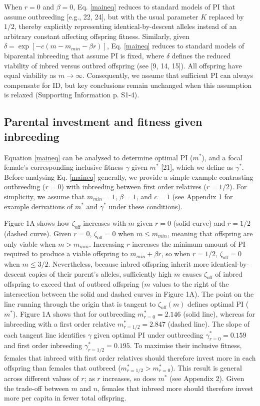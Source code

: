 \documentclass[12pt]{article}
\begin{document}
When $r=0$ and $\beta=0$, Eq. \ref{maineq} reduces to standard models of PI that assume outbreeding [e.g., 22, 24], but with the usual parameter $K$ replaced by $1/2$, thereby explicitly representing identical-by-descent alleles instead of an arbitrary constant affecting offspring fitness. Similarly, given $\delta = \exp\left[-c\left(m-m_{min}-\beta r\right)\right]$, Eq. \ref{maineq} reduces to standard models of biparental inbreeding that assume PI is fixed, where $\delta$ defines the reduced viability of inbred versus outbred offspring (see [9, 14, 15]).  All offspring have equal viability as $m \to \infty$. Consequently, we assume that sufficient PI can always compensate for ID, but key conclusions remain unchanged when this assumption is relaxed (Supporting Information p. S1-4).

\subsection*{Parental investment and fitness given inbreeding}

Equation \ref{maineq} can be analysed to determine optimal PI ($m^{*}$), and a focal female's corresponding inclusive fitness $\gamma$ given $m^{*}$ [21], which we define as $\gamma^{*}$. Before analysing Eq. \ref{maineq} generally, we provide a simple example contrasting outbreeding ($r=0$) with inbreeding between first order relatives ($r=1/2$). For simplicity, we assume that $m_{min}=1$, $\beta=1$, and $c=1$ (see Appendix 1 for example derivations of $m^{*}$ and $\gamma^{*}$ under these conditions). 

Figure 1A shows how $\zeta_{\textrm{off}}$ increases with $m$ given $r=0$ (solid curve) and $r=1/2$ (dashed curve). Given $r=0$, $\zeta_{\textrm{off}}=0$ when $m \leq m_{min}$, meaning that offspring are only viable when $m>m_{min}$. Increasing $r$ increases the minimum amount of PI required to produce a viable offspring to $m_{min}+\beta r$, so when $r=1/2$, $\zeta_{\textrm{off}}=0$ when $m \leq 3/2$. Nevertheless, because inbred offspring inherit more identical-by-descent copies of their parent's alleles, sufficiently high $m$ causes $\zeta_{\textrm{off}}$ of inbred offspring to exceed that of outbred offspring ($m$ values to the right of the intersection between the solid and dashed curves in Figure 1A). The point on the line running through the origin that is tangent to $\zeta_{\textrm{off}}(m)$ defines optimal PI ($m^{*}$). Figure 1A shows that for outbreeding $m^{*}_{r=0}=2.146$ (solid line), whereas for inbreeding with a first order relative $m^{*}_{r=1/2}=2.847$ (dashed line). The slope of each tangent line identifies $\gamma$ given optimal PI under outbreeding $\gamma^{*}_{r=0}=0.159$ and first order inbreeding $\gamma^{*}_{r=1/2}=0.195$. To maximise their inclusive fitness, females that inbreed with first order relatives should therefore invest more in each offspring than females that outbreed ($m^{*}_{r=1/2}>m^{*}_{r=0}$). This result is general across different values of $r$; as $r$ increases, so does $m^{*}$ (see Appendix 2). Given the trade-off between $m$ and $n$, females that inbreed more should therefore invest more per capita in fewer total offspring. 
\end{document}
